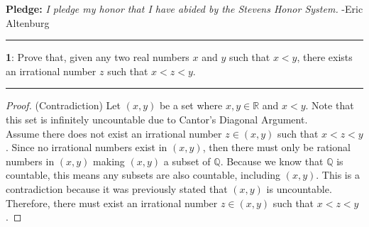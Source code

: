 \documentclass[11pt]{article}
\newcommand\question[2]{\vspace{.25in}\hrule\textbf{#1}: #2\vspace{.5em}\hrule\vspace{.10in}}
\newcommand{\R}{\mathbb{R}}
\newcommand{\Q}{\mathbb{Q}}
\begin{document}
\raggedright
\newcommand\NAME{Eric Altenburg}  %
\newcommand\COURSE{MA-240}
\newcommand\HWNUM{5 Corrections}              %


\textbf{Pledge:} \textit{I pledge my honor that I have abided by the Stevens Honor System.} -Eric Altenburg

\question{1}{Prove that, given any two real numbers $x$ and $y$ such that $x < y$, there exists an irrational number $z$ such that $x < z < y$.}

\begin{proof}
	(Contradiction) Let $(x,y)$ be a set where $x,y \in \R$ and $x < y$. Note that this set is infinitely uncountable due to Cantor's Diagonal Argument.\\ 
	Assume there does not exist an irrational number $z \in (x,y)$ such that $x < z < y$. Since no irrational numbers exist in $(x,y)$, then there must only be rational numbers in $(x,y)$ making $(x,y)$ a subset of $\Q$. Because we know that $\Q$ is countable, this means any subsets are also countable, including $(x,y)$. This is a contradiction because it was previously stated that $(x,y)$ is uncountable. Therefore, there must exist an irrational number $z \in (x,y)$ such that $x < z < y$.
\end{proof}
\end{document}
